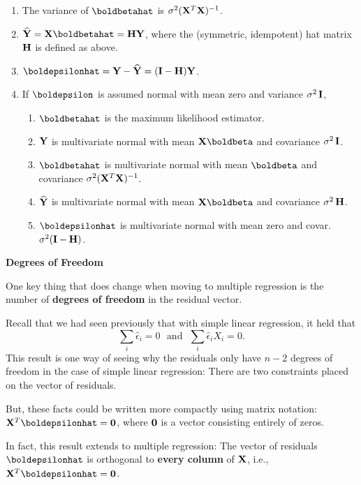 \documentclass{report}
\begin{document}
\vspace{-.4in}
\begin{enumerate}
\item The variance of $\boldbetahat$ is $\sigma^2({\bf X}^T{\bf X})^{-1}$.
\item $\widehat {\bf Y} = {\bf X} \boldbetahat = {\bf H} {\bf Y}$, where the (symmetric, idempotent) hat matrix ${\bf H}$ is defined as above.
\item $\boldepsilonhat = {\bf Y} - {\bf \widehat Y} = ({\bf I} - {\bf H}) {\bf Y}$.
\item If $\boldepsilon$ is assumed normal with mean zero and variance $\sigma^2\,{\bf I}$,
\begin{enumerate}
\item $\boldbetahat$ is the maximum likelihood estimator.
\item ${\bf Y}$ is multivariate normal with mean ${\bf X} \boldbeta$ and covariance $\sigma^2\,{\bf I}$.
\item $\boldbetahat$ is multivariate normal with mean $\boldbeta$ and covariance $\sigma^2({\bf X}^T{\bf X})^{-1}$.
\item ${\bf \widehat Y}$ is multivariate normal with mean ${\bf X} \boldbeta$ and covariance $\sigma^2\,{\bf H}$.
\item $\boldepsilonhat$ is multivariate normal with mean zero and covar. $\sigma^2({\bf I} - {\bf H})$.
\end{enumerate}
\end{enumerate}


\newpage
{\bf Degrees of Freedom}

One key thing that does change when moving to multiple regression is the number of
{\bf degrees of freedom} in the residual vector.

Recall that we had seen previously that with simple linear regression, it held that
\[
   \sum_i \widehat \epsilon_i = 0 \:\:\:\mbox{and}\:\:\: \sum_i \widehat \epsilon_i X_i = 0.
\]
This result is one way of seeing why the residuals only have $n-2$ degrees of freedom in the
case of simple linear regression: There are two constraints placed on the vector of residuals.

But, these facts could be written more compactly using matrix notation: ${\bf X}^T \boldepsilonhat = {\bf 0}$,
where ${\bf 0}$ is a vector consisting entirely of zeros.

In fact, this result extends to multiple regression: The vector of residuals $\boldepsilonhat$ is
orthogonal to {\bf every column} of ${\bf X}$, i.e., ${\bf X}^T \boldepsilonhat = {\bf 0}$.
\end{document}
